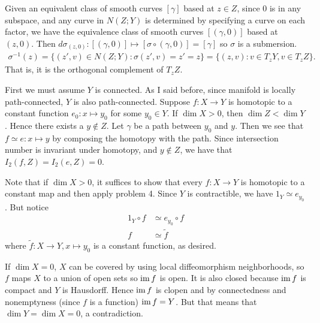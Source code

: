 \documentclass[12pt]{article}
\begin{document}
\begin{problem}[2.3.14]
	Given an equivalent class of smooth curves $ [ \gamma]$ based at $ z \in Z$, since $ 0$ is in any subspace, and any curve in $ N(Z;Y)$ is determined by specifying a curve on each factor, we have the equivalence class of smooth curves $ [ (\gamma,0)]$ based at $ (z,0)$. Then $ d \sigma_{(z,0)}:[ ( \gamma,0)] \mapsto [ \sigma \circ ( \gamma,0)] = [ \gamma]$ so $ \sigma$ is a submersion.
	 \begin{align*}
		\sigma^{-1}(z) = \{(z',v) \in N(Z;Y): \sigma(z',v)= z' = z\} = \{(z,v): v \in T_zY, v \in T_zZ\}. 
	\end{align*}
	That is, it is the orthogonal complement of $ T_zZ$.
\end{problem}
\begin{problem}[2.4.4]
First we must assume $ Y$ is connected. As I said before, since manifold is locally path-connected, $ Y$ is also path-connected. Suppose $ f: X \to Y$ is homotopic to a constant function $ e_0: x \mapsto y_0$ for some $ y_0 \in Y$. If $ \dim X>0$, then $ \dim Z < \dim Y$. Hence there exists a $ y \not\in Z$. Let $ \gamma$ be a path between $ y_0$ and $ y$. Then we see that  $ f \simeq e: x \mapsto y$ by composing the homotopy with the path. Since intersection number is invariant under homotopy, and $ y \not\in Z$, we have that $ I_2(f,Z) = I_2(e,Z) = 0$.
\end{problem}

\begin{problem}[2.4.5]
Note that if $ \dim X>0$, it suffices to show that every $ f: X \to Y$ is homotopic to a constant map and then apply problem 4. Since $ Y$ is contractible, we have  $ 1_Y \simeq e_{y_0}$. But notice
\begin{align*}
	1_Y \circ f &\simeq e_{y_0} \circ f\\
	f&\simeq \widetilde{ f}
\end{align*}
where $ \widetilde{ f}: X \to Y, x\mapsto y_0$ is a constant function, as desired.

If $ \dim X=0$, $ X$ can be covered by using local diffeomorphism neighborhoods, so $ f$ maps  $ X$ to a union of open sets so $ \operatorname{im} f$ is open. It is also closed because $ \operatorname{im} f$ is compact and $ Y$ is Hausdorff. Hence $ \operatorname{im} f$ is clopen and by connectedness and nonemptyness (since $ f$ is a function)  $ \operatorname{im} f = Y$. But that means that $ \dim Y= \dim X = 0$, a contradiction.
\end{problem}
\end{document}
